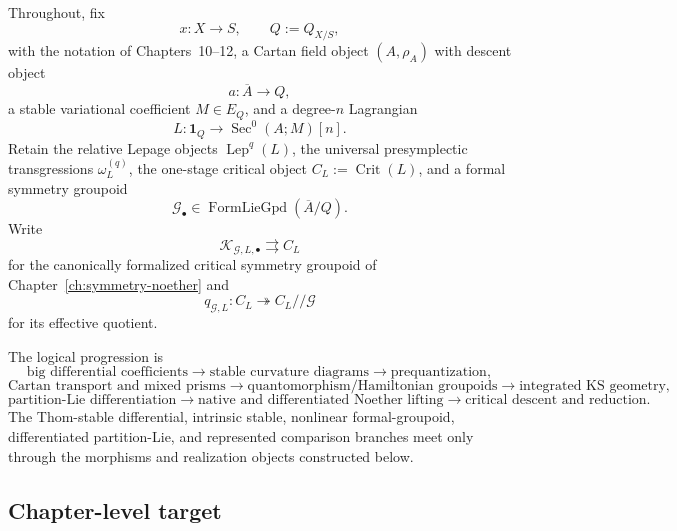 Throughout, fix
\[
x:X\longrightarrow S,
\qquad
Q:=Q_{X/S},
\]
with the notation of Chapters~10--12, a Cartan field object $(A,\rho_A)$ with
descent object
\[
a:\overline A\longrightarrow Q,
\]
a stable variational coefficient $M\in E_Q$, and a degree-$n$ Lagrangian
\[
L:\mathbf1_Q\longrightarrow\operatorname{Sec}^0(A;M)[n].
\]
Retain the relative Lepage objects $\operatorname{Lep}^q(L)$, the universal
presymplectic transgressions $\omega_L^{(q)}$, the one-stage critical object
$C_L:=\operatorname{Crit}(L)$, and a formal symmetry groupoid
\[
\mathcal G_\bullet\in\operatorname{FormLieGpd}(\overline A/Q).
\]
Write
\[
\mathcal K_{\mathcal G,L,\bullet}\rightrightarrows C_L
\]
for the canonically formalized critical symmetry groupoid of
Chapter~\ref{ch:symmetry-noether} and
\[
q_{\mathcal G,L}:C_L\twoheadrightarrow C_L//\mathcal G
\]
for its effective quotient.

The logical progression is
\[
\text{big differential coefficients}
\longrightarrow
\text{stable curvature diagrams}
\longrightarrow
\text{prequantization},
\]
\[
\text{Cartan transport and mixed prisms}
\longrightarrow
\text{quantomorphism/Hamiltonian groupoids}
\longrightarrow
\text{integrated KS geometry},
\]
\[
\text{partition-Lie differentiation}
\longrightarrow
\text{native and differentiated Noether lifting}
\longrightarrow
\text{critical descent and reduction}.
\]
The Thom-stable differential, intrinsic stable, nonlinear formal-groupoid,
differentiated partition-Lie, and represented comparison branches meet only
through the morphisms and realization objects constructed below.

\subsection{Chapter-level target}
\label{subsec:prequantum-chapter-level-target}

